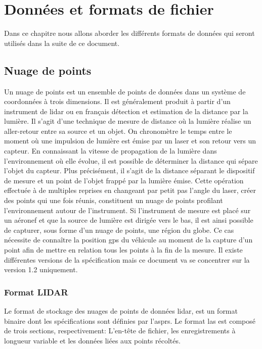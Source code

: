\chapter{Données et formats de fichier}
Dans ce chapitre nous allons aborder les différents formats de données qui seront utilisés dans la suite de ce document.

\section{Nuage de points}
Un nuage de points est un ensemble de points de données dans un système de
coordonnées à trois dimensions. Il est généralement produit à partir d'un
instrument de \gls{lidar} ou en français détection et estimation de la distance
par la lumière. Il s'agit d'une technique de mesure de distance où la lumière réalise un 
aller-retour entre sa source et un objet. On chronomètre le temps entre le moment 
où une impulsion de lumière est émise par un laser et son retour vers un capteur.
En connaissant la vitesse de propagation de la lumière dans l’environnement où elle
évolue, il est possible de déterminer la distance qui sépare l’objet du capteur.
Plus précisément, il s’agit de la distance séparant le dispositif de mesure et
un point de l’objet frappé par la lumière émise. 
Cette opération effectuée à de multiples reprises en changeant par petit pas 
l’angle du laser, créer des points qui une fois réunis, constituent un nuage de points profilant l'environnement autour de l'instrument.
Si l'instrument de mesure est placé sur un aéronef et que la source de lumière est
dirigée vers le bas, il est ainsi possible de capturer, sous forme d'un nuage de
points, une région du globe. Ce cas nécessite de connaître la position
\gls{gps} du véhicule au moment de la capture d'un point afin de mettre en relation
tous les points à la fin de la mesure.
Il existe différentes versions de la spécification mais ce document va se concentrer sur la version 1.2 uniquement.

\subsection{Format LIDAR}
Le format de stockage des nuages de points de données \gls{lidar}, est un format
binaire dont les spécifications sont définies par l'\gls{asprs}.
Le format \gls{las} est composé de trois sections, respectivement:
L'en-tête de fichier, les enregistrements à longueur variable et les données liées aux points récoltés.

